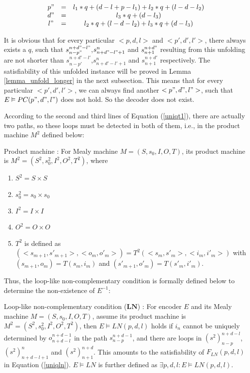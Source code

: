 \documentclass[journal]{IEEEtran}
\begin{document}
\begin{equation}
\begin{array}{ccc}
p"&=&l_1*q+(d-l+p-l_1)+l_2*q+(l-d-l_2) \\
d"&=&l_3*q+(d-l_3) \\
l"&=&l_2*q+(l-d-l_2)+l_3*q+(d-l_3)
\end{array}
\end{equation}

It is obvious that for every particular $<p,d,l>$ and $<p',d',l'>$,
there always exists a $q$,
such that $s_{n-p"}^{n+d"-l"}$,$s_{n+d"-l"+1}^n$ and $s_{n+1}^{n+d"}$ resulting from this unfolding
are not shorter than $s_{n-p'}^{n+d'-l'}$,$s_{n+d'-l'+1}^n$ and $s_{n+1}^{n+d'}$ respectively.
The satisfiability of this unfolded instance will be proved in Lemma \ref{lemma_unfold_longer} in the next subsection.
This means that for every particular $<p',d',l'>$,
we can always find another $<p",d",l">$,
such that $E\vDash PC(p",d",l")$ does not hold.
So the decoder does not exist.



According to the second and third lines of Equation (\ref{uniqt1}),
there are actually two paths,
so these loops must be detected in both of them,
i.e.,
in the product machine $M^2$ defined below:

\begin{definition11}%
Product machine :
For Mealy machine $M=(S,s_0,I,O,T)$,
its product machine is $M^2=(S^2,s_0^2,I^2,O^2,T^2)$,
where
\begin{enumerate}
  \item $S^2=S\times S$
  \item $s_0^2=s_0\times s_0$
  \item $I^2=I\times I$
  \item $O^2=O\times O$
  \item $T^2$ is defined as $(<s_{m+1},s'_{m+1}>,<o_m,o'_m>)=T^2(<s_m,s'_m>,<i_m,i'_m>)$ with $(s_{m+1},o_m)=T(s_m,i_m)$ and $(s'_{m+1},o'_m)=T(s'_m,i'_m)$.
\end{enumerate}
\end{definition11}

Thus,
the loop-like non-complementary condition is formally defined below to determine the non-existence of $E^{-1}$:

\begin{definition11}\label{def_lnc}%
Loop-like non-complementary condition ($\boldsymbol{LN}$) :
For encoder $E$ and its Mealy machine $M=(S,s_0,I,O,T)$,
assume its product machine is $M^2=(S^2,s_0^2,I^2,O^2,T^2)$,
then $E\vDash LN(p,d,l)$ holds if
$i_n$ cannot be uniquely determined by $o_{n+d-l}^{n+d-1}$ in the path $s_{n-p}^{n+d-1}$,
and there are loops in $(s^2)_{n-p}^{n+d-l}$,$(s^2)_{n+d-l+1}^n$ and $(s^2)_{n+1}^{n+d}$.
This amounts to the satisfiability of $F_{LN}(p,d,l)$ in Equation (\ref{uniqln}).
$E\vDash LN$ is further defined as $\exists p,d,l:E\vDash LN(p,d,l)$.
\end{definition11}
\end{document}
